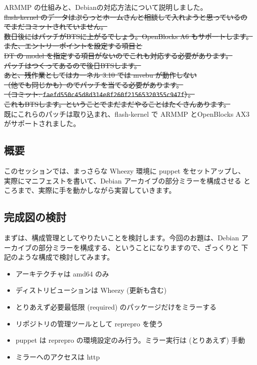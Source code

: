 \documentclass[mingoth,a4paper]{jsarticle}
\begin{document}
ARMMP の仕組みと、Debianの対応方法について説明しました。\\
\sout{flash-kernel のデータはぷらっとホームさんと相談して入れようと思っているのでまだコミットされていません。\\
数日後にはパッチがBTSに上がるでしょう。OpenBlocks A6 もサポートします。\\
また、エントリーポイントを設定する項目と\\
DT の model を指定する項目がないのでこれも対応する必要があります。\\
パッチはつくってあるので後日BTSします。\\
あと、残作業としてはカーネル 3.10 では mvebu が動作しない\\
（他でも同じかも）のでパッチを当てる必要があります。\\
（コミット: \texttt{faefd550c45d8d314e8f260f21565320355c947f}）。\\
これもBTSします。ということでまだまだやることはたくさんあります。}\\
既にこれらのパッチは取り込まれ、flash-kernel で ARMMP とOpenBlocks AX3がサポートされました。



\subsection{概要}

このセッションでは、まっさらな Wheezy 環境に puppet をセットアップし、
実際にマニフェストを書いて、Debian アーカイブの部分ミラーを構成させる
ところまで、実際に手を動かしながら実習していきます。

\subsection{完成図の検討}

まずは、構成管理としてやりたいことを検討します。今回のお題は、Debian
アーカイブの部分ミラーを構成する、ということになりますので、ざっくりと
下記のような構成で検討してみます。

\begin{itemize}
\item
  アーキテクチャは amd64 のみ
\item
  ディストリビューションは Wheezy (更新も含む)
\item
  とりあえず必要最低限 (required) のパッケージだけをミラーする
\item
  リポジトリの管理ツールとして reprepro を使う
\item
  puppet は reprepro の環境設定のみ行う。ミラー実行は (とりあえず) 手動
\item
  ミラーへのアクセスは http
\end{itemize}
\end{document}
